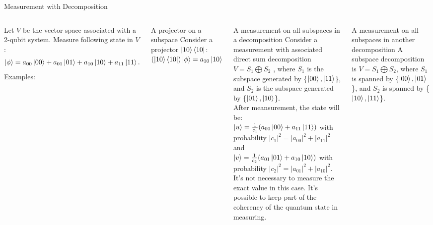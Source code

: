 \documentclass{beamer}
\begin{document}
\begin{frame}{Measurement with Decomposition}
  {\tiny
    \begin{columns}
    Let $V$ be the vector space associated with a 2-qubit system. Measure following state in $V$:
    \begin{align*}
      \ket{\phi} = a_{00}\ket{00} + a_{01}\ket{01} + a_{10}\ket{10} + a_{11}\ket{11}.
    \end{align*}
    Examples:
    \begin{block}{A projector on a subspace}
      Consider a projector $\ket{10}\bra{10}$: \\
      $(\ket{10}\bra{10}) \ket{\phi} = a_{10}\ket{10}$
    \end{block}
    \begin{block}{A measurement on all subspaces in a decomposition}
      Consider a measurement with associated direct sum decomposition $V = S_1 \bigoplus S_2$ , where $S_1$ is the subspace generated by \{$\ket{00}, \ket{11}$\},
      and $S_2$ is the subspace generated by \{$\ket{01}, \ket{10}$\}. \\
      After meansurement, the state will be:\\
      $\ket{u} = \frac{1}{c_1}(a_{00}\ket{00} + a_{11}\ket{11})$ with probability $|c_1|^2 = |a_{00}|^2 + |a_{11}|^2$ and \\
      $\ket{v} = \frac{1}{c_2}(a_{01}\ket{01} + a_{10}\ket{10})$ with probability $|c_2|^2 = |a_{01}|^2 + |a_{10}|^2$. \\
      It's not necessary to measure the exact value in this case. It's possible to keep part of the coherency of the quantum state in measuring.
    \end{block}
    \begin{block}{A measurement on all subspaces in another decomposition}
      A subspace decomposition is $V = S_1 \bigoplus S_2$, where $S_1$ is spanned by \{$\ket{00}, \ket{01}$\},
      and $S_2$ is spanned by \{$\ket{10}, \ket{11}$\}.
    \end{block}
    \end{columns}
  }%
\end{frame}
\end{document}
